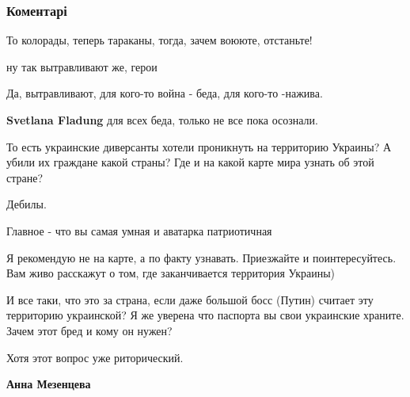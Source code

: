  
 
 
 
 
\subsubsection{Коментарі}
\label{sec:25_11_2017.fb.markova_marina.lugansk.lnr.1.rybchinskij_donbass.cmt}

\begin{itemize} %
То колорады, теперь тараканы, тогда, зачем воююте, отстаньте!

\begin{itemize} %
ну так вытравливают же, герои

Да, вытравливают, для кого-то война - беда, для кого-то -нажива.

\textbf{Svetlana Fladung} для всех беда, только не все пока осознали.
\end{itemize} %


То есть украинские диверсанты хотели проникнуть на территорию Украины? А убили
их граждане какой страны? Где и на какой карте мира узнать об этой стране?

Дебилы.

\begin{itemize} %
Главное - что вы самая умная и аватарка патриотичная


Я рекомендую не на карте, а по факту узнавать. Приезжайте и поинтересуйтесь.
Вам живо расскажут о том, где заканчивается территория Украины)


И все таки, что это за страна, если даже большой босс (Путин) считает эту
территорию украинской? Я же уверена что паспорта вы свои украинские храните.
Зачем этот бред и кому он нужен?

Хотя этот вопрос уже риторический.

\textbf{Анна Мезенцева} 


\end{itemize}
\end{itemize}
